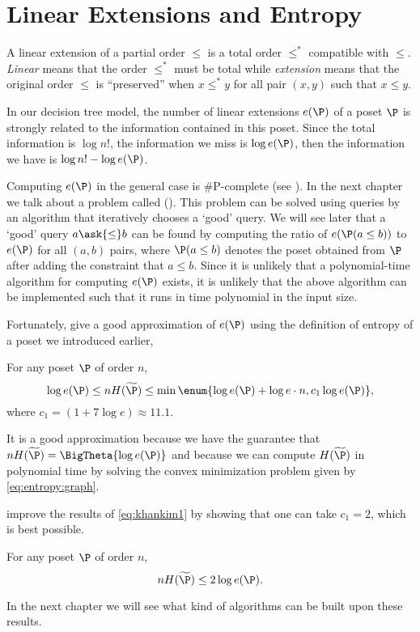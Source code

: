 \section{Linear Extensions and Entropy}

A linear extension of a partial order $\leq$ is a total order $\leq^*$
compatible with $\leq$. \emph{Linear} means that the order $\leq^*$ must be
total while \emph{extension} means that the original order $\leq$ is
``preserved'' \ie when \(x \leq^* y\) for all pair \((x,y)\) such that \(x
\leq y\).

In our decision tree model, the number of linear extensions $e(\P)$ of a poset
$\P$ is strongly related to the information contained in this poset. Since the
total information is $\log n!$, the information we miss is $\log e(\P)$, then
the information we have is $\log n! - \log e(\P)$.

Computing $e(\P)$ in the general case is \#P-complete
(see \citet*{brightwell1991counting}). In the next chapter we talk about a
problem called \supi (\SUPI). This problem can be solved using 
queries by an algorithm that
iteratively chooses a `good' query. We will see later that a `good' query \(a \ask{\le} b\) can be
found by computing the ratio of \(e(\P(a \le b))\) to \(e(\P)\) for all \((a,b)\) pairs, where
\(\P(a \le b)\) denotes the poset obtained
from \(\P\) after adding the constraint that \(a \le b\).
Since it is unlikely that
a polynomial-time algorithm for computing \(e(\P)\) exists, it is unlikely that the above algorithm
can be implemented such that it runs in time polynomial in the input size.

Fortunately, \citet*{kahn:1995} give a good
approximation of $e(\P)$ using the definition of entropy of a poset we
introduced earlier,

\begin{theorem}
\label{eq:khankim1}
For any poset \(\P\) of order \(n\),
\begin{displaymath}
\log e(\P) \le n H(\widetilde{\P}) \le \min\enum{\log e(\P) + \log e \cdot n, c_1
\log e(\P)},
\end{displaymath}
where \(c_1 = (1 + 7 \log e) \approx 11.1\).
\end{theorem}

It is a good approximation because we have the guarantee that
\(n H(\widetilde{\P}) = \BigTheta{\log e(\P)}\) and because we can compute
\(H(\widetilde{\P})\) in polynomial time by solving the convex minimization
problem given by \ref{eq:entropy:graph}.

\citet*{cardinal:2013} improve the results of \ref{eq:khankim1} by showing that
one can take \(c_1 = 2\), which is best possible.

\begin{theorem}
For any poset \(\P\) of order \(n\),
\begin{displaymath}
n H(\widetilde{\P}) \le 2 \log e(\P).
\end{displaymath}
\end{theorem}

In the next chapter we will see what kind of algorithms can be built upon
these results.
